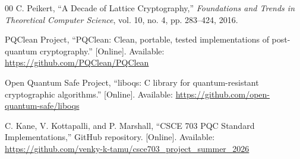 \documentclass[10pt,conference]{IEEEtran}
\begin{document}
\begin{thebibliography}{00}
 C. Peikert, ``A Decade of Lattice Cryptography,''
\emph{Foundations and Trends in Theoretical Computer Science}, vol. 10,
no. 4, pp. 283--424, 2016.

 PQClean Project, ``PQClean: Clean, portable, tested
implementations of post-quantum cryptography.'' [Online]. Available:
\url{https://github.com/PQClean/PQClean}

 Open Quantum Safe Project, ``liboqs: C library for
quantum-resistant cryptographic algorithms.'' [Online]. Available:
\url{https://github.com/open-quantum-safe/liboqs}

 C. Kane, V. Kottapalli, and P. Marshall, ``CSCE 703 PQC
Standard Implementations,'' GitHub repository.
[Online]. Available:
\url{https://github.com/venky-k-tamu/csce703_project_summer_2026}

\end{thebibliography}
\end{document}
